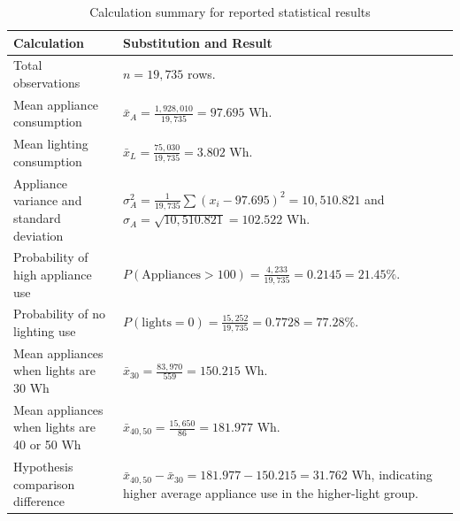 \documentclass[12pt,a4paper]{article}
\begin{document}
\begin{longtable}{|p{4cm}|p{9.2cm}|}
\caption{Calculation summary for reported statistical results}
\label{tab:calculation-summary}\\
\hline
\textbf{Calculation} & \textbf{Substitution and Result} \\
\hline
Total observations & $n = 19,735$ rows. \\
\hline
Mean appliance consumption & $\bar{x}_{A} = \frac{1,928,010}{19,735} = 97.695$ Wh. \\
\hline
Mean lighting consumption & $\bar{x}_{L} = \frac{75,030}{19,735} = 3.802$ Wh. \\
\hline
Appliance variance and standard deviation & $\sigma_A^2 = \frac{1}{19,735}\sum(x_i-97.695)^2 = 10,510.821$ and $\sigma_A=\sqrt{10,510.821}=102.522$ Wh. \\
\hline
Probability of high appliance use & $P(\mathrm{Appliances}>100)=\frac{4,233}{19,735}=0.2145=21.45\%$. \\
\hline
Probability of no lighting use & $P(\mathrm{lights}=0)=\frac{15,252}{19,735}=0.7728=77.28\%$. \\
\hline
Mean appliances when lights are 30 Wh & $\bar{x}_{30}=\frac{83,970}{559}=150.215$ Wh. \\
\hline
Mean appliances when lights are 40 or 50 Wh & $\bar{x}_{40,50}=\frac{15,650}{86}=181.977$ Wh. \\
\hline
Hypothesis comparison difference & $\bar{x}_{40,50}-\bar{x}_{30}=181.977-150.215=31.762$ Wh, indicating higher average appliance use in the higher-light group. \\
\hline
\end{longtable}
\end{document}
